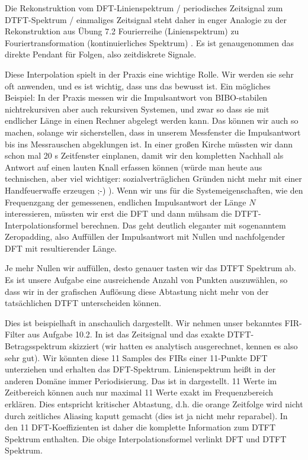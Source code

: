 \begin{Loesung}
Die Rekonstruktion 
vom DFT-Linienspektrum / periodisches Zeitsignal zum
DTFT-Spektrum / einmaliges Zeitsignal steht daher in enger Analogie zu der
Rekonstruktion aus Übung 7.2 Fourierreihe (Linienspektrum) zu
Fouriertransformation (kontinuierliches Spektrum) . Es ist genaugenommen das
direkte Pendant für Folgen, also zeitdiskrete Signale.

Diese Interpolation spielt in der Praxis eine wichtige Rolle. Wir werden sie sehr
oft anwenden, und es ist wichtig, dass uns das bewusst ist.
Ein mögliches Beispiel:
In der Praxis messen wir
die Impulsantwort von BIBO-stabilen nichtrekursiven aber auch rekursiven Systemen,
und zwar so dass sie mit endlicher Länge in einen Rechner abgelegt werden kann.
%
Das können wir auch so machen, solange wir sicherstellen, dass
in unserem Messfenster die Impulsantwort
bis ins Messrauschen abgeklungen ist.
In einer großen Kirche müssten wir dann schon mal 20 s Zeitfenster einplanen,
damit wir den kompletten Nachhall als Antwort auf einen lauten Knall erfassen
können (würde man heute aus technischen, aber viel wichtiger:
sozialverträglichen Gründen nicht mehr mit einer Handfeuerwaffe erzeugen ;-) ).
%
Wenn wir uns für die Systemeigenschaften, wie den Frequenzgang der gemessenen,
endlichen Impulsantwort der Länge $N$ interessieren, müssten wir erst die
DFT und dann mühsam die DTFT-Interpolationsformel berechnen. Das geht deutlich
eleganter mit sogenanntem Zeropadding, also Auffüllen der Impulsantwort mit
Nullen und nachfolgender DFT mit resultierender Länge.

Je mehr Nullen wir auffüllen, desto genauer tasten wir das DTFT Spektrum ab.
Es ist unsere Aufgabe eine ausreichende Anzahl von Punkten auszuwählen,
so dass wir in der grafischen Auflösung diese Abtastung nicht mehr
von der tatsächlichen DTFT unterscheiden können.

Dies ist beispielhaft in  anschaulich dargestellt.
Wir nehmen unser bekanntes FIR-Filter aus Aufgabe 10.2.
In  ist das Zeitsignal und das exakte DTFT-Betragsspektrum
skizziert (wir hatten es analytisch ausgerechnet, kennen es also sehr gut).
%
Wir könnten diese 11 Samples des FIRs einer 11-Punkte DFT unterziehen und erhalten
das DFT-Spektrum. Linienspektrum heißt in der anderen Domäne immer Periodisierung.
Das ist in  dargestellt. 11 Werte im Zeitbereich
können auch nur maximal 11 Werte exakt im Frequenzbereich erklären. Dies
entspricht kritischer Abtastung, d.h. die orange Zeitfolge wird nicht durch
zeitliches Aliasing kaputt gemacht (dies ist ja nicht mehr reparabel).
In den 11 DFT-Koeffizienten ist daher die komplette Information zum DTFT
Spektrum enthalten. Die obige Interpolationsformel  
verlinkt DFT und DTFT Spektrum.


\end{Loesung}
